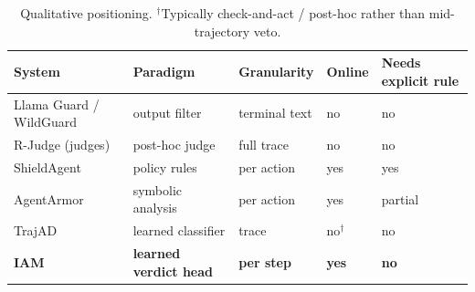 \begin{table}[t]
  \centering
  \small
  \begin{tabular}{lllll}
    \toprule
    System & Paradigm & Granularity & Online & Needs explicit rule \\
    \midrule
    Llama Guard / WildGuard & output filter      & terminal text & no  & no \\
    R-Judge (judges)        & post-hoc judge     & full trace    & no  & no \\
    ShieldAgent             & policy rules       & per action    & yes & yes \\
    AgentArmor              & symbolic analysis  & per action    & yes & partial \\
    TrajAD                  & learned classifier & trace         & no$^{\dagger}$ & no \\
    \textbf{IAM}     & \textbf{learned verdict head} & \textbf{per step} & \textbf{yes} & \textbf{no} \\
    \bottomrule
  \end{tabular}
  \caption{Qualitative positioning. $^{\dagger}$Typically check-and-act /
  post-hoc rather than mid-trajectory veto. %
  }
  \label{tab:positioning}
\end{table}
